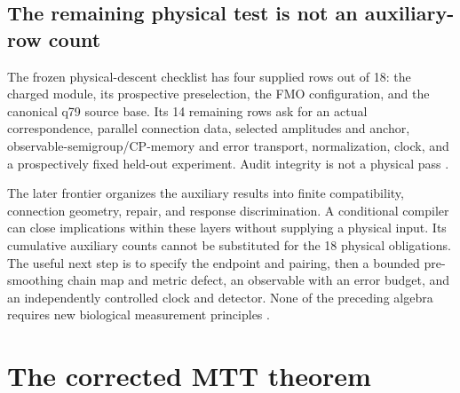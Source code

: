 \documentclass[11pt]{article}
\theoremstyle{definition}
\theoremstyle{remark}
\begin{document}
\subsection{The remaining physical test is not an auxiliary-row count}
\label{sec:physical-gate}
The frozen physical-descent checklist has four supplied rows out of 18:
the charged module, its prospective preselection, the FMO configuration,
and the canonical q79 source base. Its 14 remaining rows ask for an actual
correspondence, parallel connection data, selected amplitudes and anchor,
observable-semigroup/CP-memory and error transport, normalization, clock,
and a prospectively fixed held-out experiment. Audit integrity is not a
physical pass \cite{beq43}.

The later frontier organizes the auxiliary results into finite compatibility,
connection geometry, repair, and response discrimination. A conditional
compiler can close implications within these layers without supplying a
physical input. Its cumulative auxiliary counts cannot be substituted for
the 18 physical obligations. The useful next step is to specify the endpoint
and pairing, then a bounded pre-smoothing chain map and metric defect,
an observable with an error budget, and an independently controlled clock
and detector. None of the preceding algebra requires new biological
measurement principles \cite{beq48}.

\section{The corrected MTT theorem}
\end{document}
